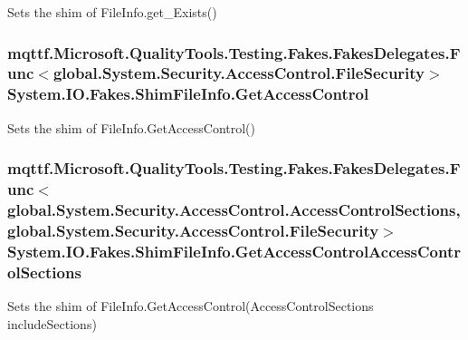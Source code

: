 Sets the shim of File\-Info.\-get\-\_\-\-Exists()

\hypertarget{class_system_1_1_i_o_1_1_fakes_1_1_shim_file_info_ae197bc603910a10c15e44cd8bfdf12be}{
\subsubsection[{Get\-Access\-Control}]{\setlength{\rightskip}{0pt plus 5cm}mqttf.\-Microsoft.\-Quality\-Tools.\-Testing.\-Fakes.\-Fakes\-Delegates.\-Func$<$global.\-System.\-Security.\-Access\-Control.\-File\-Security$>$ System.\-I\-O.\-Fakes.\-Shim\-File\-Info.\-Get\-Access\-Control\hspace{0.3cm}{\ttfamily [set]}}}\label{class_system_1_1_i_o_1_1_fakes_1_1_shim_file_info_ae197bc603910a10c15e44cd8bfdf12be}


Sets the shim of File\-Info.\-Get\-Access\-Control()

\hypertarget{class_system_1_1_i_o_1_1_fakes_1_1_shim_file_info_a3c30a12b9f6b8aec2b14e8d13844f43f}{
\subsubsection[{Get\-Access\-Control\-Access\-Control\-Sections}]{\setlength{\rightskip}{0pt plus 5cm}mqttf.\-Microsoft.\-Quality\-Tools.\-Testing.\-Fakes.\-Fakes\-Delegates.\-Func$<$global.\-System.\-Security.\-Access\-Control.\-Access\-Control\-Sections, global.\-System.\-Security.\-Access\-Control.\-File\-Security$>$ System.\-I\-O.\-Fakes.\-Shim\-File\-Info.\-Get\-Access\-Control\-Access\-Control\-Sections\hspace{0.3cm}{\ttfamily [set]}}}\label{class_system_1_1_i_o_1_1_fakes_1_1_shim_file_info_a3c30a12b9f6b8aec2b14e8d13844f43f}


Sets the shim of File\-Info.\-Get\-Access\-Control(\-Access\-Control\-Sections include\-Sections)

